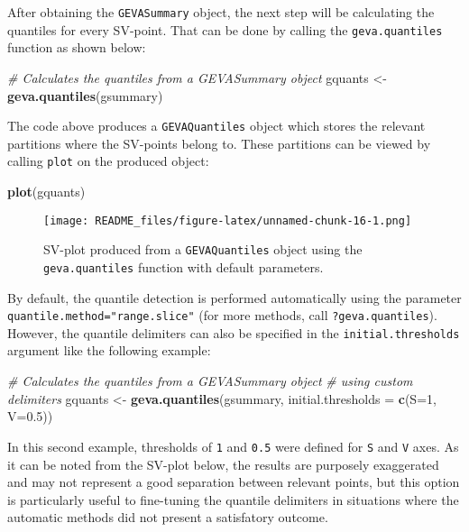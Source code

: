 \documentclass[
  12pt,
]{article}
\newenvironment{Shaded}{\begin{snugshade}}{\end{snugshade}}
\newcommand{\CommentTok}[1]{\textcolor[rgb]{0.56,0.35,0.01}{\textit{#1}}}
\newcommand{\DataTypeTok}[1]{\textcolor[rgb]{0.13,0.29,0.53}{#1}}
\newcommand{\DecValTok}[1]{\textcolor[rgb]{0.00,0.00,0.81}{#1}}
\newcommand{\FloatTok}[1]{\textcolor[rgb]{0.00,0.00,0.81}{#1}}
\newcommand{\KeywordTok}[1]{\textcolor[rgb]{0.13,0.29,0.53}{\textbf{#1}}}
\newcommand{\NormalTok}[1]{#1}
\newcommand{\StringTok}[1]{\textcolor[rgb]{0.31,0.60,0.02}{#1}}
\begin{document}
After obtaining the \texttt{GEVASummary} object, the next step will be
calculating the quantiles for every SV-point. That can be done by
calling the \texttt{geva.quantiles} function as shown below:

\begin{Shaded}
\begin{Highlighting}[]
\CommentTok{# Calculates the quantiles from a GEVASummary object}
\NormalTok{gquants <-}\StringTok{ }\KeywordTok{geva.quantiles}\NormalTok{(gsummary)}
\end{Highlighting}
\end{Shaded}

The code above produces a \texttt{GEVAQuantiles} object which stores the
relevant partitions where the SV-points belong to. These partitions can
be viewed by calling \texttt{plot} on the produced object:

\begin{Shaded}
\begin{Highlighting}[]
\KeywordTok{plot}\NormalTok{(gquants)}
\end{Highlighting}
\end{Shaded}

\begin{figure}
\centering
\texttt{[image: README\_files/figure-latex/unnamed-chunk-16-1.png]}
\caption{SV-plot produced from a \texttt{GEVAQuantiles} object using the
\texttt{geva.quantiles} function with default parameters.}
\end{figure}

By default, the quantile detection is performed automatically using the
parameter \texttt{quantile.method="range.slice"} (for more methods, call
\texttt{?geva.quantiles}). However, the quantile delimiters can also be
specified in the \texttt{initial.thresholds} argument like the following
example:

\begin{Shaded}
\begin{Highlighting}[]
\CommentTok{# Calculates the quantiles from a GEVASummary object}
\CommentTok{# using custom delimiters}
\NormalTok{gquants <-}\StringTok{ }\KeywordTok{geva.quantiles}\NormalTok{(gsummary,}
                          \DataTypeTok{initial.thresholds =} \KeywordTok{c}\NormalTok{(}\DataTypeTok{S=}\DecValTok{1}\NormalTok{, }\DataTypeTok{V=}\FloatTok{0.5}\NormalTok{))}
\end{Highlighting}
\end{Shaded}

In this second example, thresholds of \texttt{1} and \texttt{0.5} were
defined for \texttt{S} and \texttt{V} axes. As it can be noted from the
SV-plot below, the results are purposely exaggerated and may not
represent a good separation between relevant points, but this option is
particularly useful to fine-tuning the quantile delimiters in situations
where the automatic methods did not present a satisfatory outcome.
\end{document}
